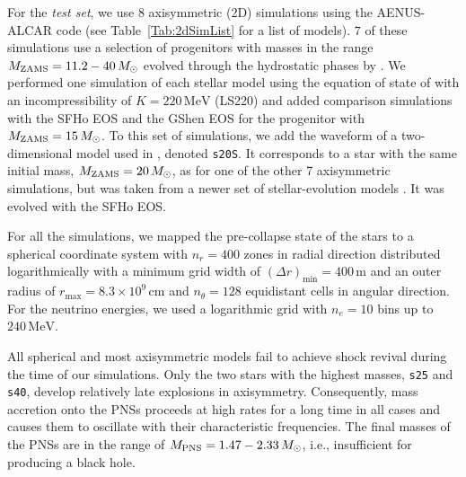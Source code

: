  
{For the {\it test set}, we use $8$ axisymmetric (2D) simulations using the AENUS-ALCAR code
(see Table~\ref{Tab:2dSimList} for a list of models).
$7$ of these simulations use a selection of progenitors with masses in the range} $M_{\mathrm{ZAMS}} = 11.2 - 40 \, M_{\odot}$
 evolved through the hydrostatic phases by
\cite{Woosley_Heger_Weaver__2002__ReviewsofModernPhysics__The_evolution_and_explosion_of_massive_stars}.
We performed one simulation of each stellar model using the equation
of state of \cite{Lattimer_Swesty__1991__NuclearPhysicsA__LS-EOS} with
an incompressibility of $K = 220 \, \mathrm{MeV}$ (LS220) and added
comparison simulations with the SFHo EOS
\cite{Steiner_et_al__2013__apj__Core-collapseSupernovaEquationsofStateBasedonNeutronStarObservations}
and the GShen EOS 
\cite{Shen_et_al__2011__prc__Newequationofstateforastrophysicalsimulations}
for the {progenitor} with $M_{\mathrm{ZAMS}} = 15 \, M_{\odot}$. To this set of
simulations, we add the waveform of a two-dimensional model used in
\cite{Torres:2019a}, denoted \texttt{s20S}. It corresponds to a star
with the same initial mass, $M_{\mathrm{ZAMS}} = 20 \, M_{\odot}$, as for
one of the other 7 axisymmetric simulations, but was taken from a
newer set of stellar-evolution models
\cite{Woosley_Heger__2007__physrep__Nucleosynthesisandremnantsinmassivestarsofsolarmetallicity}.
It was evolved with the SFHo EOS.


{For all the simulations,} we mapped the pre-collapse state of the stars to a spherical
coordinate system with $n_r = 400$ zones in radial direction
distributed logarithmically with a minimum grid width of
$(\Delta r)_{\mathrm{min}} = 400 \, \mathrm{m}$ and an outer radius of
$r_{\mathrm{max}} = 8.3 \times 10^{9} \, \mathrm{cm}$ and
$n_{\theta} = 128$ equidistant cells in angular direction. For the
neutrino energies, we used a logarithmic grid with $n_e = 10$ bins up
to $240 \, \mathrm{MeV}$.

All spherical and most axisymmetric models fail to achieve shock
revival during the time of our simulations. Only the two stars with
the highest masses, \texttt{s25} and \texttt{s40}, develop relatively
late explosions in axisymmetry. Consequently, mass accretion onto the
PNSs proceeds at high rates for a long time in all cases and causes
them to oscillate with their characteristic frequencies. The final
masses of the PNSs are in the range of
$M_{\mathrm{PNS}} = 1.47 - 2.33 \, M_{\odot}$, i.e., insufficient for
producing a black hole.


 	

